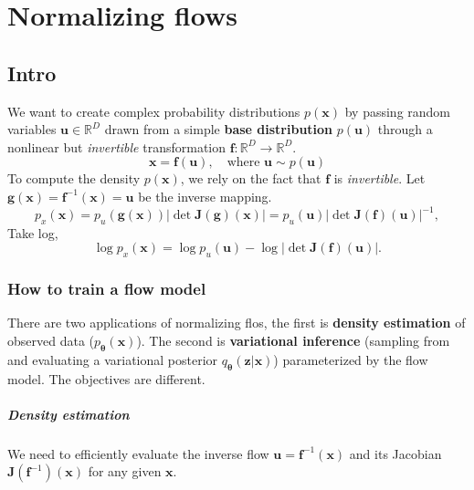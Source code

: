 \documentclass[../main.tex]{subfiles}
\begin{document}
\chapter{Normalizing flows}

\section{Intro}

We want to create complex probability distributions $p(\boldsymbol{x})$ by passing random
variables $\boldsymbol{u} \in  \mathbb{R}^{D}$ drawn from a simple \textbf{base distribution} $p(\boldsymbol{u})$ through a nonlinear
but \emph{invertible} transformation $\boldsymbol{f} : \mathbb{R}^{D} \to  \mathbb{R}^{D}$. 
\[
\boldsymbol{x} = \boldsymbol{f}(\boldsymbol{u}), \quad \text{where } \boldsymbol{u} \sim  p(\boldsymbol{u})
\]
To compute the density $p(\boldsymbol{x})$, we rely on the fact that $\boldsymbol{f}$ is \emph{invertible}. Let $\boldsymbol{g}(\boldsymbol{x}) = \boldsymbol{f}^{-1}(\boldsymbol{x}) = \boldsymbol{u}$ be the 
inverse mapping.
\[
p_{x}(\boldsymbol{x}) = p_{u} \left( \boldsymbol{g}(\boldsymbol{x}) \right) \left\vert \det \boldsymbol{J}(\boldsymbol{g}) (\boldsymbol{x})\right\vert  = p_{u}(\boldsymbol{u}) \left\vert \det \boldsymbol{J}(\boldsymbol{f}) (\boldsymbol{u}) \right\vert ^{-1},
\]
Take log,
\[
\log p_{x}(\boldsymbol{x}) = \log p_{u}(\boldsymbol{u}) - \log \left\vert \det \boldsymbol{J}(\boldsymbol{f})(\boldsymbol{u}) \right\vert .
\]

\subsection{How to train a flow model}

There are two applications of normalizing flos, the first is \textbf{density estimation} of observed data ($p_{\boldsymbol{\theta}}(\boldsymbol{x})$). The second is \textbf{variational inference} (sampling from and evaluating a variational posterior $q_{\boldsymbol{\theta}}(\boldsymbol{z} | \boldsymbol{x})$) parameterized by the flow model.
The objectives are different.


\paragraph{Density estimation} We need to efficiently evaluate the inverse flow $\boldsymbol{u} = \boldsymbol{f}^{-1}(\boldsymbol{x})$ and its Jacobian $\boldsymbol{J}(\boldsymbol{f}^{-1})(\boldsymbol{x})$ for any given $\boldsymbol{x}$.
\end{document}
